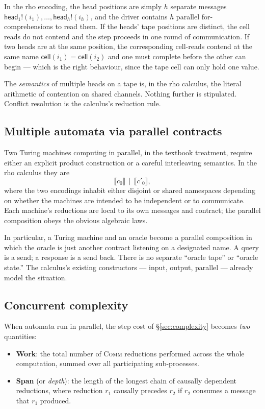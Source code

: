 \documentclass[11pt]{article}
\theoremstyle{plain}
\theoremstyle{definition}
\theoremstyle{remark}
\newcommand{\snd}[2]{#1!(#2)}
\newcommand{\sembrack}[1]{\llbracket #1 \rrbracket}
\newcommand{\sn}{\mathbin{\mid}}    %
\newcommand{\Cell}{\mathsf{cell}}
\newcommand{\Head}{\mathsf{head}}
\begin{document}
In the rho encoding, the head positions are simply $h$ separate
messages $\snd{\Head_1}{i_1}, \ldots, \snd{\Head_h}{i_h}$, and the driver
contains $h$ parallel for-comprehensions to read them. If the heads' tape
positions are distinct, the cell reads do not contend and the step
proceeds in one round of communication. If two heads are at the same
position, the corresponding cell-reads contend at the same name
$\Cell(i_1) = \Cell(i_2)$ and one must complete before the other can
begin --- which is the right behaviour, since the tape cell can only hold
one value.

The \emph{semantics} of multiple heads on a tape is, in the rho calculus,
the literal arithmetic of contention on shared channels. Nothing further
is stipulated. Conflict resolution is the calculus's reduction rule.

\subsection{Multiple automata via parallel contracts}\label{sec:multimachine}

Two Turing machines computing in parallel, in the textbook treatment,
require either an explicit product construction or a careful interleaving
semantics. In the rho calculus they are
$$
\sembrack{c_0} \,\sn\, \sembrack{c'_0},
$$
\noindent where the two encodings inhabit either disjoint or shared
namespaces depending on whether the machines are intended to be
independent or to communicate. Each machine's reductions are local to its
own messages and contract; the parallel composition obeys the obvious
algebraic laws.

In particular, a Turing machine and an oracle become a parallel
composition in which the oracle is just another contract listening on a
designated name. A query is a send; a response is a send back. There is
no separate ``oracle tape'' or ``oracle state.'' The calculus's existing
constructors --- input, output, parallel --- already model the situation.

\subsection{Concurrent complexity}\label{sec:concurrentcomplexity}

When automata run in parallel, the step cost of
\S\ref{sec:complexity} becomes \emph{two} quantities:

\begin{itemize}
\item \textbf{Work}: the total number of \textsc{Comm} reductions performed
across the whole computation, summed over all participating sub-processes.
\item \textbf{Span} (or \emph{depth}): the length of the longest chain of
causally dependent reductions, where reduction $r_1$ causally precedes
$r_2$ if $r_2$ consumes a message that $r_1$ produced.
\end{itemize}
\end{document}

